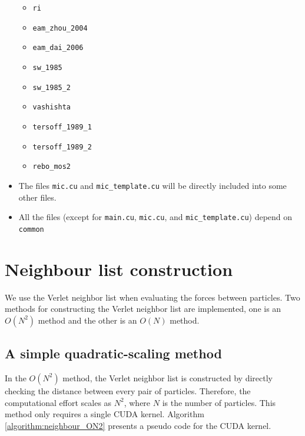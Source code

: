 \documentclass[12pt,a4paper]{report}
\begin{document}
\begin{itemize}
\begin{itemize}
        \item \verb"ri"
        \item \verb"eam_zhou_2004"
        \item \verb"eam_dai_2006"
        \item \verb"sw_1985"
        \item \verb"sw_1985_2"
        \item \verb"vashishta"
        \item \verb"tersoff_1989_1"
        \item \verb"tersoff_1989_2"
        \item \verb"rebo_mos2"
        \end{itemize}
  \item The files \verb"mic.cu" and \verb"mic_template.cu" will be directly included into some other files.
\item All the files (except for \verb"main.cu", \verb"mic.cu", and \verb"mic_template.cu") depend on \verb"common"
\end{itemize}




\section{Neighbour list construction}


We use the Verlet neighbor list when evaluating the forces between particles. Two methods for constructing the Verlet neighbor list are implemented, one is an $O(N^2)$ method and the other is an $O(N)$ method.


\subsection{A simple quadratic-scaling method}

In the $O(N^2)$ method, the Verlet neighbor list is constructed by directly checking the distance between every pair of particles. Therefore, the computational effort scales as $N^2$, where $N$ is the number of particles. This method only requires a single CUDA kernel.
Algorithm \ref{algorithm:neighbour_ON2} presents a pseudo code for the CUDA kernel.
\end{document}
